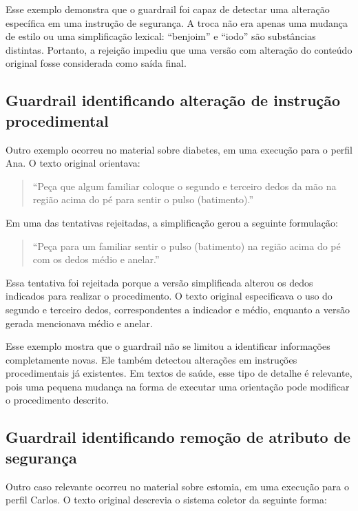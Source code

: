 Esse exemplo demonstra que o guardrail foi capaz de detectar uma alteração específica em uma instrução de segurança. A troca não era apenas uma mudança de estilo ou uma simplificação lexical: ``benjoim'' e ``iodo'' são substâncias distintas. Portanto, a rejeição impediu que uma versão com alteração do conteúdo original fosse considerada como saída final.

\subsection{Guardrail identificando alteração de instrução procedimental}
\label{subsec:guardrail-alteracao-instrucao-procedimental}

Outro exemplo ocorreu no material sobre diabetes, em uma execução para o perfil Ana. O texto original orientava:

\begin{quote}
``Peça que algum familiar coloque o segundo e terceiro dedos da mão na região acima do pé para sentir o pulso (batimento).''
\end{quote}

Em uma das tentativas rejeitadas, a simplificação gerou a seguinte formulação:

\begin{quote}
``Peça para um familiar sentir o pulso (batimento) na região acima do pé com os dedos médio e anelar.''
\end{quote}

Essa tentativa foi rejeitada porque a versão simplificada alterou os dedos indicados para realizar o procedimento. O texto original especificava o uso do segundo e terceiro dedos, correspondentes a indicador e médio, enquanto a versão gerada mencionava médio e anelar.

Esse exemplo mostra que o guardrail não se limitou a identificar informações completamente novas. Ele também detectou alterações em instruções procedimentais já existentes. Em textos de saúde, esse tipo de detalhe é relevante, pois uma pequena mudança na forma de executar uma orientação pode modificar o procedimento descrito.

\subsection{Guardrail identificando remoção de atributo de segurança}
\label{subsec:guardrail-remocao-atributo-seguranca}

Outro caso relevante ocorreu no material sobre estomia, em uma execução para o perfil Carlos. O texto original descrevia o sistema coletor da seguinte forma:

